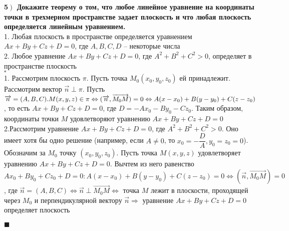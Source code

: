 \documentclass[a4paper,12pt]{article}
\begin{document}
    \textbf{5$\left.\right)$ Докажите теорему о том, что любое линейное уравнение на координаты точки в трехмерном пространстве задает плоскость и что любая плоскость определяется линейным уравнением.}\\1. Любая плоскость в пространстве определяется уравнением $Ax+By+Cz+D=0$, где $A, B, C, D$ -- некоторые числа\\
    2. Любое уравнение $Ax+By+Cz+D=0$, где $A^2+B^2+C^2>0$, определяет в пространстве плоскость\\
    $\square$\\
    1. Рассмотрим плоскость $\pi$. Пусть точка $M_0(x_0, y_0, z_0)$ ей принадлежит. Рассмотрим вектор $\overrightarrow{n}\perp\pi$. Пусть $\overrightarrow{n}=(A, B, C).\\M(x, y, z)\in\pi\Leftrightarrow(\overrightarrow{n},\overrightarrow{M_0M})=0\Leftrightarrow A(x-x_0)+B(y-y_0)+C(z-z_0)$, то есть $Ax+By+Cz+D=0$, где $D=-Ax_0-By_0-Cz_0$. Таким образом, координаты точки $M$ удовлетворяют уравнению $Ax+By+Cz+D=0$\\
    2.Рассмотрим уравнение $Ax+By+Cz+D=0$, где $A^2+B^2+C^2>0$. Оно имеет хотя бы одно решение (например, если $A\ne0$, то $x_0=-\dfrac{D}{A}, y_0=z_0=0$). Обозначим за $M_0$ точку $(x_0, y_0, z_0)$. Пусть точка $M(x, y, z)$ удовлетворяет уравнению $Ax+By+Cz+D=0$. Вычтем из него равенство $Ax_0+By_0+Cz_0+D=0:A(x-x_0)+B(y-y_0)+C(z-z_0)=0\Leftrightarrow(\overrightarrow{n}, \overrightarrow{M_0M})=0$, где $\overrightarrow{n}=(A, B, C)\Leftrightarrow\overrightarrow{n}\perp\overrightarrow{M_0M}\Leftrightarrow$ точка $M$ лежит в плоскости, проходящей через $M_0$ и перпендикулярной вектору $\overrightarrow{n}\Rightarrow$ уравнение $Ax+By+Cz+D=0$ определяет плоскость
    \begin{flushright}
        $\blacksquare$
    \end{flushright}
\end{document}
